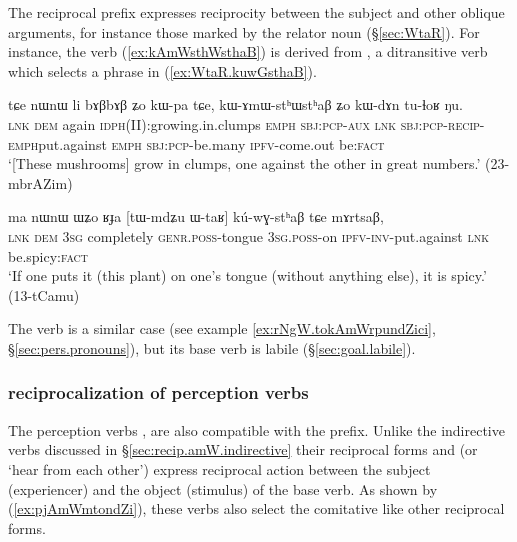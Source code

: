 The reciprocal  prefix expresses reciprocity between the subject and other oblique arguments,  for instance those marked by the relator noun  (§\ref{sec:WtaR}). For instance, the verb  (\ref{ex:kAmWsthWsthaB}) is derived from , a ditransitive verb which selects a phrase in  (\ref{ex:WtaR.kuwGsthaB}).

\begin{exe}
\ex \label{ex:kAmWsthWsthaB}
\gll tɕe nɯnɯ li bɤβbɤβ ʑo kɯ-pa tɕe, kɯ-ɤmɯ-stʰɯ\redp{}stʰaβ ʑo kɯ-dɤn tu-ɬoʁ ŋu. \\
\textsc{lnk} \textsc{dem} again \textsc{idph}(II):growing.in.clumps \textsc{emph} \textsc{sbj}:\textsc{pcp}-\textsc{aux} \textsc{lnk} \textsc{sbj}:\textsc{pcp}-\textsc{recip}-\textsc{emph}\redp{}put.against \textsc{emph} \textsc{sbj}:\textsc{pcp}-be.many \textsc{ipfv}-come.out be:\textsc{fact} \\
\glt `[These mushrooms] grow in clumps, one against the other in great numbers.' (23-mbrAZim)
\end{exe}

\begin{exe}
\ex \label{ex:WtaR.kuwGsthaB}
\gll ma nɯnɯ ɯʑo ʁɟa [tɯ-mdʑu ɯ-taʁ] kú-wɣ-stʰaβ tɕe mɤrtsaβ, \\
 \textsc{lnk} \textsc{dem} \textsc{3sg} completely \textsc{genr}.\textsc{poss}-tongue \textsc{3sg}.\textsc{poss}-on \textsc{ipfv}-\textsc{inv}-put.against \textsc{lnk} be.spicy:\textsc{fact} \\
\glt `If one puts it (this plant) on one's tongue (without anything else), it is spicy.' (13-tCamu)
\end{exe}

The verb  is a similar case (see example \ref{ex:rNgW.tokAmWrpundZici}, §\ref{sec:pers.pronouns}), but its base verb  is labile (§\ref{sec:goal.labile}).

\subsubsection{ reciprocalization of perception verbs}
The perception verbs ,  are also compatible with the  prefix. Unlike the indirective verbs discussed in §\ref{sec:recip.amW.indirective} their reciprocal forms   and   (or `hear from each other') express reciprocal action between the subject (experiencer) and the object (stimulus) of the base verb. As shown by (\ref{ex:pjAmWmtondZi}), these verbs also select the comitative like other reciprocal forms.

